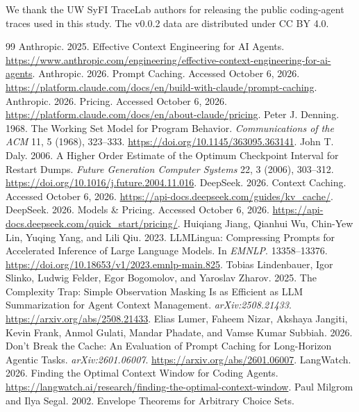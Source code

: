 \documentclass[sigconf,screen,nonacm]{acmart}
\begin{document}
\begin{acks}
We thank the UW SyFI TraceLab authors for releasing the public coding-agent
traces used in this study. The v0.0.2 data are distributed under CC BY 4.0.
\end{acks}

\begin{thebibliography}{99}
Anthropic. 2025. Effective Context Engineering for AI Agents.
\url{https://www.anthropic.com/engineering/effective-context-engineering-for-ai-agents}.
Anthropic. 2026. Prompt Caching. Accessed October 6, 2026.
\url{https://platform.claude.com/docs/en/build-with-claude/prompt-caching}.
Anthropic. 2026. Pricing. Accessed October 6, 2026.
\url{https://platform.claude.com/docs/en/about-claude/pricing}.
Peter J. Denning. 1968. The Working Set Model for Program Behavior.
\emph{Communications of the ACM} 11, 5 (1968), 323--333.
\url{https://doi.org/10.1145/363095.363141}.
John T. Daly. 2006. A Higher Order Estimate of the Optimum Checkpoint Interval
for Restart Dumps. \emph{Future Generation Computer Systems} 22, 3 (2006),
303--312. \url{https://doi.org/10.1016/j.future.2004.11.016}.
DeepSeek. 2026. Context Caching. Accessed October 6, 2026.
\url{https://api-docs.deepseek.com/guides/kv_cache/}.
DeepSeek. 2026. Models \& Pricing. Accessed October 6, 2026.
\url{https://api-docs.deepseek.com/quick_start/pricing/}.
Huiqiang Jiang, Qianhui Wu, Chin-Yew Lin, Yuqing Yang, and Lili Qiu. 2023.
LLMLingua: Compressing Prompts for Accelerated Inference of Large Language
Models. In \emph{EMNLP}. 13358--13376.
\url{https://doi.org/10.18653/v1/2023.emnlp-main.825}.
Tobias Lindenbauer, Igor Slinko, Ludwig Felder, Egor Bogomolov, and Yaroslav
Zharov. 2025. The Complexity Trap: Simple Observation Masking Is as Efficient
as LLM Summarization for Agent Context Management.
\emph{arXiv:2508.21433}. \url{https://arxiv.org/abs/2508.21433}.
Elias Lumer, Faheem Nizar, Akshaya Jangiti, Kevin Frank, Anmol Gulati, Mandar
Phadate, and Vamse Kumar Subbiah. 2026. Don't Break the Cache: An Evaluation
of Prompt Caching for Long-Horizon Agentic Tasks.
\emph{arXiv:2601.06007}. \url{https://arxiv.org/abs/2601.06007}.
LangWatch. 2026. Finding the Optimal Context Window for Coding Agents.
\url{https://langwatch.ai/research/finding-the-optimal-context-window}.
Paul Milgrom and Ilya Segal. 2002. Envelope Theorems for Arbitrary Choice Sets.

\end{thebibliography}
\end{document}
